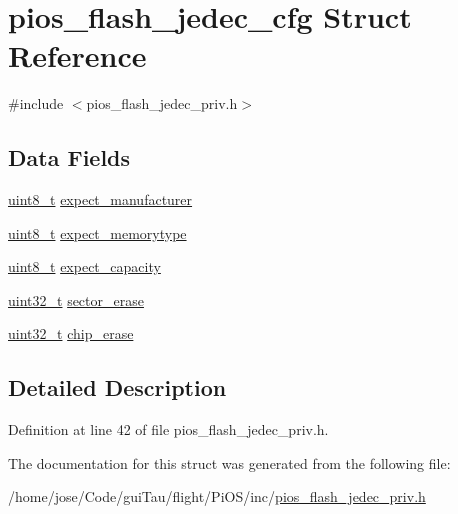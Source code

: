 \hypertarget{structpios__flash__jedec__cfg}{\section{pios\-\_\-flash\-\_\-jedec\-\_\-cfg Struct Reference}
\label{structpios__flash__jedec__cfg}
}


{\ttfamily \#include $<$pios\-\_\-flash\-\_\-jedec\-\_\-priv.\-h$>$}

\subsection*{Data Fields}
\begin{DoxyCompactItemize}
\item 
\hyperlink{stdint_8h_aba7bc1797add20fe3efdf37ced1182c5}{uint8\-\_\-t} \hyperlink{group___p_i_o_s___f_l_a_s_h_gab7416f66a2c392cc5a27e12cbf4e9a07}{expect\-\_\-manufacturer}
\item 
\hyperlink{stdint_8h_aba7bc1797add20fe3efdf37ced1182c5}{uint8\-\_\-t} \hyperlink{group___p_i_o_s___f_l_a_s_h_gacfb5714f6cef5d14a78a38ebe2369b43}{expect\-\_\-memorytype}
\item 
\hyperlink{stdint_8h_aba7bc1797add20fe3efdf37ced1182c5}{uint8\-\_\-t} \hyperlink{group___p_i_o_s___f_l_a_s_h_ga33911ac74387cebdbc4bb2fe3d5541a6}{expect\-\_\-capacity}
\item 
\hyperlink{stdint_8h_a435d1572bf3f880d55459d9805097f62}{uint32\-\_\-t} \hyperlink{group___p_i_o_s___f_l_a_s_h_gae824eeb4a55e49fa84a48f1d43ae788c}{sector\-\_\-erase}
\item 
\hyperlink{stdint_8h_a435d1572bf3f880d55459d9805097f62}{uint32\-\_\-t} \hyperlink{group___p_i_o_s___f_l_a_s_h_ga24dfbff52821d42480cde7686f07e956}{chip\-\_\-erase}
\end{DoxyCompactItemize}


\subsection{Detailed Description}


Definition at line 42 of file pios\-\_\-flash\-\_\-jedec\-\_\-priv.\-h.



The documentation for this struct was generated from the following file\-:\begin{DoxyCompactItemize}
\item 
/home/jose/\-Code/gui\-Tau/flight/\-Pi\-O\-S/inc/\hyperlink{pios__flash__jedec__priv_8h}{pios\-\_\-flash\-\_\-jedec\-\_\-priv.\-h}\end{DoxyCompactItemize}
